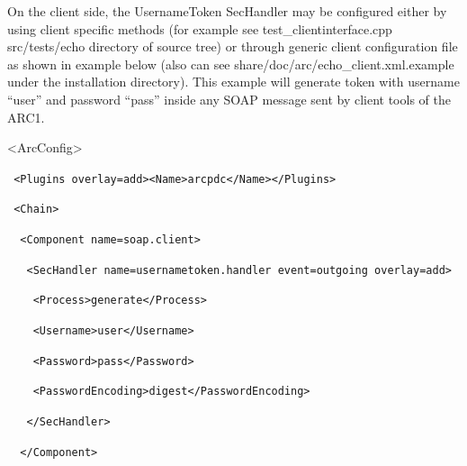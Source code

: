 \documentclass{article}
\begin{document}
{\color{black}
On the client side, the UsernameToken SecHandler may be configured
either by using client specific methods (for example see
test\_clientinterface.cpp src/tests/echo directory of source tree) or
through generic client configuration file as shown in example below
(also can see share/doc/arc/echo\_client.xml.example under the
installation directory). This example will generate token with username
{\textquotedblleft}user{\textquotedblright} and password
{\textquotedblleft}pass{\textquotedblright} inside any SOAP message
sent by client tools of the ARC1.}

{\ttfamily\color{black}
{\textless}ArcConfig{\textgreater}}

{\upshape\color{black}
\texttt{\ {\textless}Plugins
overlay={\textquotedbl}add{\textquotedbl}{\textgreater}{\textless}Name{\textgreater}arcpdc{\textless}/Name{\textgreater}{\textless}/Plugins{\textgreater}}}

{\upshape\color{black}
\texttt{\ {\textless}Chain{\textgreater}}}

{\upshape\color{black}
\texttt{\ \ {\textless}Component
name={\textquotedbl}soap.client{\textquotedbl}{\textgreater}}}

{\upshape\color{black}
\texttt{\ \ \ {\textless}SecHandler
name={\textquotedbl}usernametoken.handler{\textquotedbl}
event={\textquotedbl}outgoing{\textquotedbl}
overlay={\textquotedbl}add{\textquotedbl}{\textgreater}}}

{\upshape\color{black}
\texttt{\ \ \ \ {\textless}Process{\textgreater}generate{\textless}/Process{\textgreater}}}

{\upshape\color{black}
\texttt{\ \ \ \ {\textless}Username{\textgreater}user{\textless}/Username{\textgreater}}}

{\upshape\color{black}
\texttt{\ \ \ \ {\textless}Password{\textgreater}pass{\textless}/Password{\textgreater}}}

{\upshape\color{black}
\texttt{\ \ \ \ {\textless}PasswordEncoding{\textgreater}digest{\textless}/PasswordEncoding{\textgreater}}}

{\upshape\color{black}
\texttt{\ \ \ {\textless}/SecHandler{\textgreater}}}

{\upshape\color{black}
\texttt{\ \ {\textless}/Component{\textgreater}}}
\end{document}
